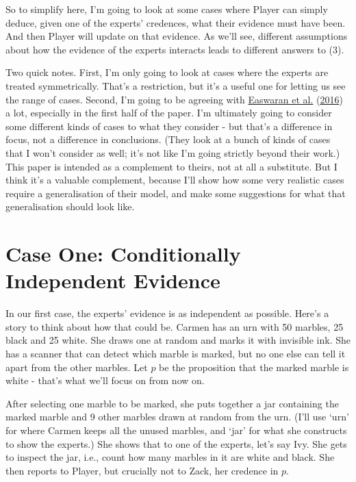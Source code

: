 \documentclass[
  12pt,
]{article}
\begin{document}
So to simplify here, I'm going to look at some cases where Player can
simply deduce, given one of the experts' credences, what their evidence
must have been. And then Player will update on that evidence. As we'll
see, different assumptions about how the evidence of the experts
interacts leads to different answers to (3).

Two quick notes. First, I'm only going to look at cases where the
experts are treated symmetrically. That's a restriction, but it's a
useful one for letting us see the range of cases. Second, I'm going to
be agreeing with \protect\hyperlink{ref-EaswaranEtAl2016}{Easwaran et
al.} (\protect\hyperlink{ref-EaswaranEtAl2016}{2016}) a lot, especially
in the first half of the paper. I'm ultimately going to consider some
different kinds of cases to what they consider - but that's a difference
in focus, not a difference in conclusions. (They look at a bunch of
kinds of cases that I won't consider as well; it's not like I'm going
strictly beyond their work.) This paper is intended as a complement to
theirs, not at all a substitute. But I think it's a valuable complement,
because I'll show how some very realistic cases require a generalisation
of their model, and make some suggestions for what that generalisation
should look like.

\hypertarget{case-one-conditionally-independent-evidence}{%
\section{Case One: Conditionally Independent
Evidence}\label{case-one-conditionally-independent-evidence}}

In our first case, the experts' evidence is as independent as possible.
Here's a story to think about how that could be. Carmen has an urn with
50 marbles, 25 black and 25 white. She draws one at random and marks it
with invisible ink. She has a scanner that can detect which marble is
marked, but no one else can tell it apart from the other marbles. Let
\(p\) be the proposition that the marked marble is white - that's what
we'll focus on from now on.

After selecting one marble to be marked, she puts together a jar
containing the marked marble and 9 other marbles drawn at random from
the urn. (I'll use `urn' for where Carmen keeps all the unused marbles,
and `jar' for what she constructs to show the experts.) She shows that
to one of the experts, let's say Ivy. She gets to inspect the jar, i.e.,
count how many marbles in it are white and black. She then reports to
Player, but crucially not to Zack, her credence in \(p\).
\end{document}
